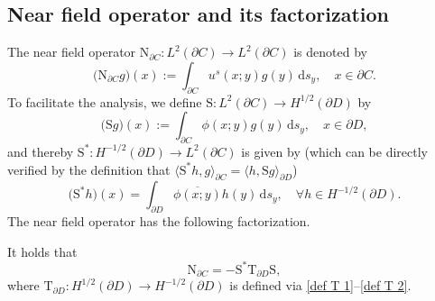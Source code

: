 \documentclass[final]{siamltex}
\newcommand{\ind}{\,\mbox{d}}
\begin{document}
\subsection{Near field operator and its factorization}
The near field operator $\mathrm{N}_{\partial C}: L^2(\partial C) \to L^2(\partial C)$ is denoted by
\begin{equation} \label{cavity N def}
\big( \mathrm{N}_{\partial C} g \big) (x):= \int_{\partial C} u^s(x;y) g(y) \ind s_y, \quad  x \in \partial C.
\end{equation}
To facilitate the analysis, we define $ \mathrm{S}:L^2(\partial C) \to H^{1/2}(\partial D)$ by
\begin{equation} \label{cavity S def}
\big( \mathrm{S} g \big) (x):= \int_{\partial C} \phi(x;y) g(y) \ind s_y, \quad  x \in \partial D,
\end{equation}
and thereby  $ \mathrm{S}^*:H^{-1/2}(\partial D) \to L^2(\partial C) $ is given by (which can be directly verified by the definition that $\langle \mathrm{S}^* h,g\rangle_{\partial C}=\langle h,\mathrm{S}g\rangle_{\partial D}$)
\begin{equation} \label{cavity S* def}
\big(\mathrm{S}^* h \big)(x) =  \int_{\partial D} \overline{\phi(x;y)} h(y)  \ind s_y, \quad \forall h \in H^{-1/2}(\partial D).
\end{equation}
The near field operator has the following factorization.
\begin{theorem} It holds that
\begin{equation} \label{cavity NO factorization}
\mathrm{N}_{\partial C} = -  \mathrm{S}^* \mathrm{T}_{\partial D} \mathrm{S},
\end{equation}
where $ \mathrm{T}_{\partial D}: H^{1/2}(\partial D) \to H^{-1/2}(\partial D)$ is defined via \eqref{def T 1}--\eqref{def T 2}.
\end{theorem}
\end{document}
